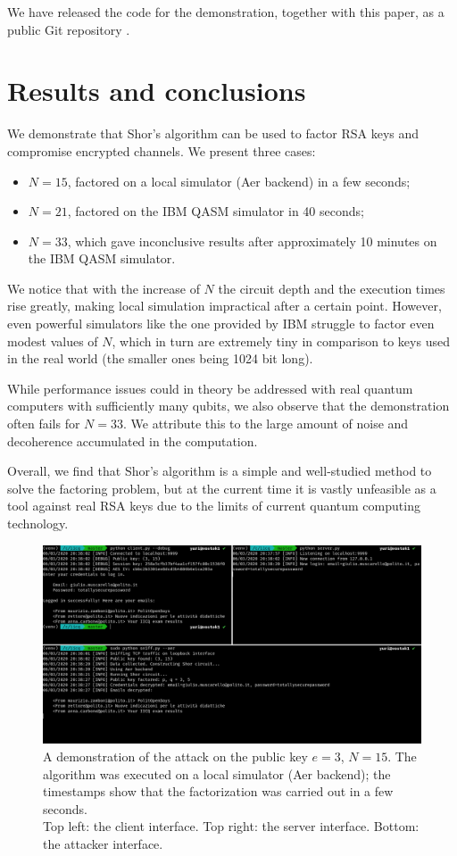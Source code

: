 \documentclass[conference]{IEEEtran}
\begin{document}
We have released the code for the demonstration, together with this paper, as a public Git repository \cite{github-repo-main}.

\section{Results and conclusions}
We demonstrate that Shor's algorithm can be used to factor RSA keys and compromise encrypted channels. We present three cases:
\begin{itemize}
\item $N=15$, factored on a local simulator (Aer backend) in a few seconds;
\item $N=21$, factored on the IBM QASM simulator in 40 seconds;
\item $N=33$, which gave inconclusive results after approximately 10 minutes on the IBM QASM simulator.
\end{itemize}

We notice that with the increase of $N$ the circuit depth and the execution times rise greatly, making local simulation impractical after a certain point. However, even powerful simulators like the one provided by IBM struggle to factor even modest values of $N$, which in turn are extremely tiny in comparison to keys used in the real world (the smaller ones being 1024 bit long).

While performance issues could in theory be addressed with real quantum computers with sufficiently many qubits, we also observe that the demonstration often fails for $N=33$. We attribute this to the large amount of noise and decoherence accumulated in the computation.

Overall, we find that Shor's algorithm is a simple and well-studied method to solve the factoring problem, but at the current time it is vastly unfeasible as a tool against real RSA keys due to the limits of current quantum computing technology.

\begin{figure}[b]
   \centering
   \includegraphics[width=\textwidth,height=\textheight,keepaspectratio]{2020-06-03_20-38.png}
   \caption{A demonstration of the attack on the public key $e=3$, $N=15$. The algorithm was executed on a local simulator (Aer backend); the timestamps show that the factorization was carried out in a few seconds.\\Top left: the client interface. Top right: the server interface. Bottom: the attacker interface.}
\end{figure}
\end{document}

